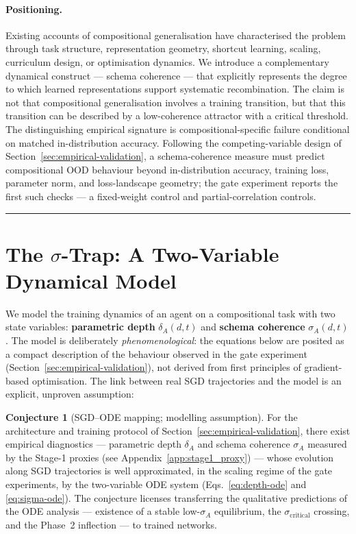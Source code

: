 \documentclass{article}
\theoremstyle{definition}
\newtheorem{conjecture}{Conjecture}
\begin{document}
\paragraph{Positioning.}
Existing accounts of compositional generalisation have characterised
the problem through task structure, representation geometry, shortcut
learning, scaling, curriculum design, or optimisation dynamics. We
introduce a complementary dynamical construct --- schema coherence ---
that explicitly represents the degree to which learned representations
support systematic recombination. The claim is not that compositional
generalisation involves a training transition, but that this transition
can be described by a low-coherence attractor with a critical threshold.
The distinguishing empirical signature is compositional-specific failure
conditional on matched in-distribution accuracy. Following the
competing-variable design of Section~\ref{sec:empirical-validation}, a
schema-coherence measure must predict compositional OOD behaviour beyond
in-distribution accuracy, training loss, parameter norm, and
loss-landscape geometry; the gate experiment reports the first such
checks --- a fixed-weight control and partial-correlation controls.

\noindent\rule{\linewidth}{0.4pt}

\section{The \texorpdfstring{$\sigma$}{sigma}-Trap: A Two-Variable Dynamical Model}\label{sec:core-framework}

We model the training dynamics of an agent on a compositional task with
two state variables: \textbf{parametric depth} $\delta_A(d,t)$ and
\textbf{schema coherence} $\sigma_A(d,t)$. The model is deliberately
\emph{phenomenological}: the equations below are posited as a compact
description of the behaviour observed in the gate experiment
(Section~\ref{sec:empirical-validation}), not derived from first
principles of gradient-based optimisation. The link between real SGD
trajectories and the model is an explicit, unproven assumption:

\begin{conjecture}[SGD--ODE mapping; modelling assumption]
\label{conj:sgd-ode}
For the architecture and training protocol of
Section~\ref{sec:empirical-validation}, there exist empirical
diagnostics --- parametric depth $\delta_A$ and schema coherence
$\sigma_A$ measured by the Stage-1 proxies (see Appendix~\ref{app:stage1_proxy}) --- whose evolution along SGD trajectories is well approximated,
in the scaling regime of the gate experiments, by the two-variable ODE
system (Eqs.~\eqref{eq:depth-ode} and \eqref{eq:sigma-ode}). The
conjecture licenses transferring the qualitative predictions of the ODE
analysis --- existence of a stable low-$\sigma_A$ equilibrium, the
$\sigma_{\text{critical}}$ crossing, and the Phase~2 inflection --- to
trained networks.
\end{conjecture}
\end{document}
